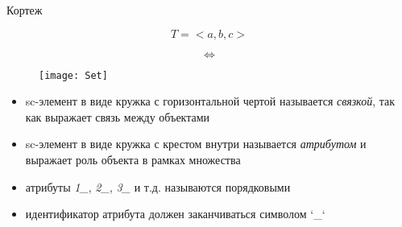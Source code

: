 \documentclass[hyperref={pdftex,unicode}]{beamer}
\newcommand{\objeqv}{
  \begin{center}
    \begin{sideways}
      \[ \Longleftrightarrow \]
    \end{sideways}
  \end{center}
}
\begin{document}
\begin{frame}{Кортеж}
  \begin{center}
    \[ T = <a, b, c> \]
    
    \objeqv

    \begin{figure}
      \texttt{[image: Set]}
    \end{figure}
  \end{center}

  \begin{itemize}
  \item sc-элемент в виде кружка с горизонтальной чертой называется
    \emph{связкой}, так как выражает связь между объектами
  \item sc-элемент в виде кружка с крестом внутри называется
    \emph{атрибутом} и выражает роль объекта в рамках множества
  \item атрибуты \emph{1\_}, \emph{2\_}, \emph{3\_} и т.д. называются порядковыми
  \item идентификатор атрибута должен заканчиваться символом `_`
  \end{itemize}
\end{frame}
\end{document}
